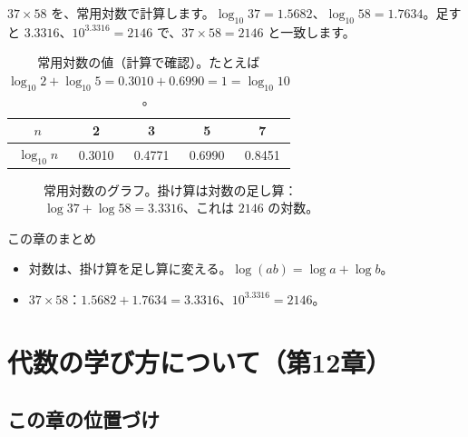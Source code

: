 \documentclass[a4paper,11pt,openany]{ltjsbook}
\begin{document}
$37\times58$ を、常用対数で計算します。$\log_{10}37=1.5682$、$\log_{10}58=1.7634$。足すと $3.3316$、$10^{3.3316}=2146$ で、$37\times58=2146$ と一致します。

\begin{table}[htbp]
\centering
\begin{tabular}{c|cccc}
\toprule
$n$ & 2 & 3 & 5 & 7\\
\midrule
$\log_{10}n$ & 0.3010 & 0.4771 & 0.6990 & 0.8451\\
\bottomrule
\end{tabular}
\caption{常用対数の値（計算で確認）。たとえば $\log_{10}2+\log_{10}5=0.3010+0.6990=1=\log_{10}10$。}
\end{table}

\begin{figure}[htbp]
\centering
{}
\caption{常用対数のグラフ。掛け算は対数の足し算：$\log37+\log58=3.3316$、これは $2146$ の対数。}
\end{figure}

\begin{pointbox}{この章のまとめ}
\begin{itemize}[leftmargin=*]
\item 対数は、掛け算を足し算に変える。$\log(ab)=\log a+\log b$。
\item $37\times58$：$1.5682+1.7634=3.3316$、$10^{3.3316}=2146$。
\end{itemize}
\end{pointbox}

\chapter{代数の学び方について（第12章）}

\section{この章の位置づけ}
\end{document}
